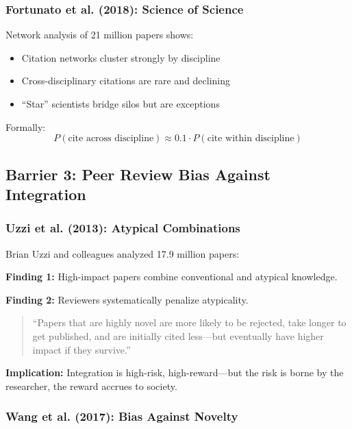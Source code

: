 \documentclass[12pt,a4paper]{article}
\begin{document}
\subsubsection{Fortunato et al. (2018): Science of Science}

Network analysis of 21 million papers shows:
\begin{itemize}
\item Citation networks cluster strongly by discipline
\item Cross-disciplinary citations are rare and declining
\item ``Star'' scientists bridge silos but are exceptions
\end{itemize}

Formally:
\begin{equation}
P(\text{cite across discipline}) \approx 0.1 \cdot P(\text{cite within discipline})
\end{equation}

\subsection{Barrier 3: Peer Review Bias Against Integration}
\label{sec:barrier3}

\subsubsection{Uzzi et al. (2013): Atypical Combinations}

Brian Uzzi and colleagues analyzed 17.9 million papers:

\textbf{Finding 1:} High-impact papers combine conventional and atypical knowledge.

\textbf{Finding 2:} Reviewers systematically penalize atypicality.

\begin{quote}
``Papers that are highly novel are more likely to be rejected, take longer to get published, and are initially cited less—but eventually have higher impact if they survive.''
\end{quote}

\textbf{Implication:} Integration is high-risk, high-reward—but the risk is borne by the researcher, the reward accrues to society.

\subsubsection{Wang et al. (2017): Bias Against Novelty}
\end{document}
